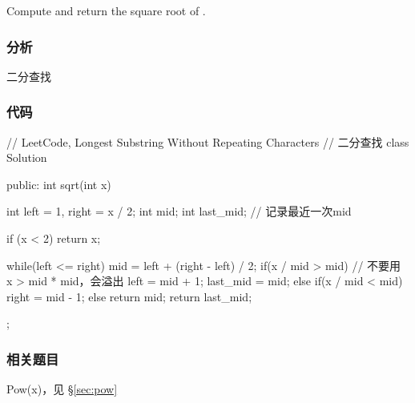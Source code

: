 Compute and return the square root of .


\subsubsection{分析}
二分查找


\subsubsection{代码}
\begin{Code}
// LeetCode, Longest Substring Without Repeating Characters
// 二分查找
class Solution {
public:
    int sqrt(int x) {
        int left = 1, right = x / 2;
        int mid;
        int last_mid;  // 记录最近一次mid

        if (x < 2) return x;

        while(left <= right) {
            mid = left + (right - left) / 2;
            if(x / mid > mid) { // 不要用 x > mid * mid，会溢出
                left = mid + 1;
                last_mid = mid;
            } else if(x / mid < mid) {
                right = mid - 1;
            } else {
                return mid;
            }
        }
        return last_mid;
    }
};
\end{Code}


\subsubsection{相关题目}
\begindot
\item Pow(x)，见 \S \ref{sec:pow}
\myenddot
